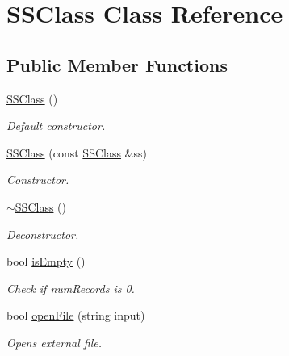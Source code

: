 \hypertarget{classSSClass}{}\section{S\+S\+Class Class Reference}
\label{classSSClass}
\subsection*{Public Member Functions}
\begin{DoxyCompactItemize}
\item 
\mbox{\label{classSSClass_ab4603d6a236c4fa65f896a1158c0d2ef}} 
\hyperlink{classSSClass_ab4603d6a236c4fa65f896a1158c0d2ef}{S\+S\+Class} ()
\begin{DoxyCompactList}\small\item\em Default constructor. \end{DoxyCompactList}\item 
\mbox{\label{classSSClass_a5801614847b5403b1a5899150acd3b5c}} 
\hyperlink{classSSClass_a5801614847b5403b1a5899150acd3b5c}{S\+S\+Class} (const \hyperlink{classSSClass}{S\+S\+Class} \&ss)
\begin{DoxyCompactList}\small\item\em Constructor. \end{DoxyCompactList}\item 
\mbox{\label{classSSClass_a6e5abb04de9b90e34cc6422069ff5729}} 
\hyperlink{classSSClass_a6e5abb04de9b90e34cc6422069ff5729}{$\sim$\+S\+S\+Class} ()
\begin{DoxyCompactList}\small\item\em Deconstructor. \end{DoxyCompactList}\item 
bool \hyperlink{classSSClass_afc95611385e4d389818332414d5c491c}{is\+Empty} ()
\begin{DoxyCompactList}\small\item\em Check if num\+Records is 0. \end{DoxyCompactList}\item 
bool \hyperlink{classSSClass_a92e012441608ea36f3013fb3cbea9da8}{open\+File} (string input)
\begin{DoxyCompactList}\small\item\em Opens external file. \end{DoxyCompactList}\item 

\end{DoxyCompactItemize}
